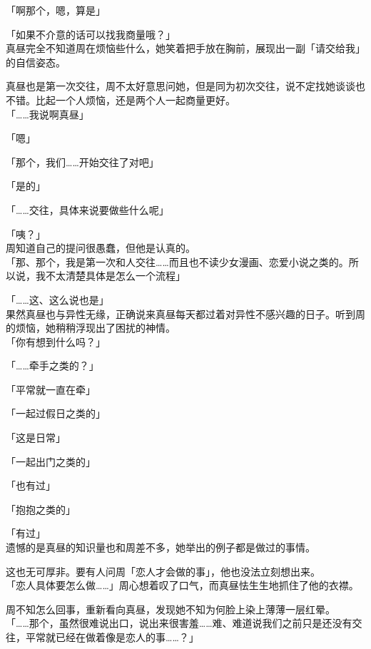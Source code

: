 「啊那个，嗯，算是」

「如果不介意的话可以找我商量哦？」\\

真昼完全不知道周在烦恼些什么，她笑着把手放在胸前，展现出一副「请交给我」的自信姿态。

真昼也是第一次交往，周不太好意思问她，但是同为初次交往，说不定找她谈谈也不错。比起一个人烦恼，还是两个人一起商量更好。\\

「……我说啊真昼」

「嗯」

「那个，我们……开始交往了对吧」

「是的」

「……交往，具体来说要做些什么呢」

「咦？」\\

周知道自己的提问很愚蠢，但他是认真的。\\

「那、那个，我是第一次和人交往……而且也不读少女漫画、恋爱小说之类的。所以说，我不太清楚具体是怎么一个流程」

「……这、这么说也是」\\

果然真昼也与异性无缘，正确说来真昼每天都过着对异性不感兴趣的日子。听到周的烦恼，她稍稍浮现出了困扰的神情。\\

「你有想到什么吗？」

「……牵手之类的？」

「平常就一直在牵」

「一起过假日之类的」

「这是日常」

「一起出门之类的」

「也有过」

「抱抱之类的」

「有过」\\

遗憾的是真昼的知识量也和周差不多，她举出的例子都是做过的事情。

这也无可厚非。要有人问周「恋人才会做的事」，他也没法立刻想出来。\\

「恋人具体要怎么做……」周心想着叹了口气，而真昼怯生生地抓住了他的衣襟。

周不知怎么回事，重新看向真昼，发现她不知为何脸上染上薄薄一层红晕。\\

「……那个，虽然很难说出口，说出来很害羞……难、难道说我们之前只是还没有交往，平常就已经在做着像是恋人的事……？」\\

